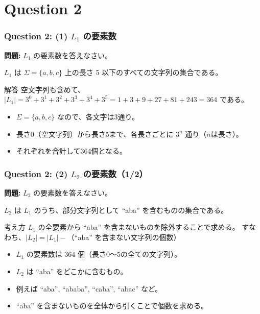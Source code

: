 \section{Question 2}
\begin{frame}
  \frametitle{Question 2: (1) $L_1$ の要素数}
  
  \textbf{問題:} $L_1$ の要素数を答えなさい。
  
  $L_1$ は $\Sigma = \{a, b, c\}$ 上の長さ 5 以下のすべての文字列の集合である。
  
  \begin{alertblock}{解答}
    空文字列も含めて、
    $|L_1| = 3^0 + 3^1 + 3^2 + 3^3 + 3^4 + 3^5 = 1 + 3 + 9 + 27 + 81 + 243 = 364$
    である。
  \end{alertblock}

  \begin{itemize}
    \item $\Sigma = \{a, b, c\}$ なので、各文字は3通り。
    \item 長さ0（空文字列）から長さ5まで、各長さごとに $3^n$ 通り（$n$は長さ）。
    \item それぞれを合計して364個となる。
  \end{itemize}
\end{frame}


\begin{frame}
  \frametitle{Question 2: (2) $L_2$ の要素数（1/2）}
  \textbf{問題:} $L_2$ の要素数を答えなさい。
  
  $L_2$ は $L_1$ のうち、部分文字列として ``aba'' を含むものの集合である。
  
  \begin{alertblock}{考え方}
    $L_1$ の全要素から ``aba'' を含まないものを除外することで求める。
    すなわち、$|L_2| = |L_1| - $（``aba'' を含まない文字列の個数）
  \end{alertblock}

  \begin{itemize}
    \item $L_1$ の要素数は $364$ 個（長さ0～5の全ての文字列）。
    \item $L_2$ は ``aba'' をどこかに含むもの。
    \item 例えば ``aba'', ``ababa'', ``caba'', ``abac'' など。
    \item ``aba'' を含まないものを全体から引くことで個数を求める。
  \end{itemize}
\end{frame}


